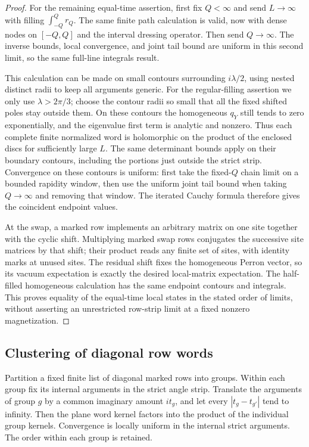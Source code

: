 \begin{proof}
For the remaining equal-time assertion, first fix $Q<\infty$
and send $L\to\infty$ with filling
$\int_{-Q}^Qr_Q$.  The same finite path calculation is valid,
now with dense nodes on $[-Q,Q]$ and the interval dressing
operator.  Then send $Q\to\infty$.
The inverse bounds, local convergence, and joint tail bound
are uniform in this second limit, so the same full-line integrals
result.

This calculation can be made on small contours surrounding
$i\lambda/2$, using nested distinct radii to keep all arguments
generic.  For the regular-filling assertion we only use
$\lambda>2\pi/3$; choose the contour radii so small that all the
fixed shifted poles stay outside them.
On these contours the homogeneous $q_Y$ still tends to zero
exponentially, and the eigenvalue first term is analytic and
nonzero.  Thus each complete finite normalized word is holomorphic on the
product of the enclosed discs for sufficiently large $L$.
The same determinant bounds apply on their boundary contours, including
the portions just outside the strict strip. Convergence on these
contours is uniform: first take the fixed-$Q$ chain limit on a bounded
rapidity window, then use the uniform joint tail bound when taking
$Q\to\infty$ and removing that window. The iterated Cauchy formula
therefore gives the coincident endpoint values.

At the swap, a marked row implements an arbitrary matrix on one site
together with the cyclic shift. Multiplying marked swap rows conjugates
the successive site matrices by that shift; their product reads any
finite set of sites, with identity marks at unused sites. The residual
shift fixes the homogeneous Perron vector, so its vacuum expectation
is exactly the desired local-matrix expectation. The half-filled
homogeneous calculation has the same endpoint contours and integrals.
This proves
equality of the equal-time local states in the stated order of
limits, without asserting an unrestricted row-strip limit at a
fixed nonzero magnetization.
\end{proof}

\subsection{Clustering of diagonal row words}

\begin{proposition}\label{prop:word-clustering}
Partition a fixed finite list of diagonal marked rows into groups.
Within each group fix its internal arguments in the strict angle
strip.  Translate the arguments of group $g$ by a common imaginary
amount $it_g$, and let every $|t_g-t_{g'}|$ tend to infinity.
Then the plane word kernel factors into the product of the
individual group kernels.  Convergence is locally uniform in
the internal strict arguments.  The order within each group is
retained.
\end{proposition}

